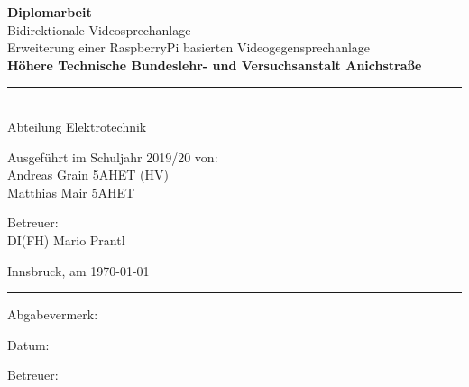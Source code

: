 \begin{center}
	\vspace*{2cm}
	\Huge\textbf{Diplomarbeit}\\
	\vspace*{2cm}
	\huge Bidirektionale Videosprechanlage\\
	\vspace*{0.5cm}
	\normalsize Erweiterung einer RaspberryPi basierten Videogegensprechanlage\\
	\vspace*{1.5cm}
	\textbf{Höhere Technische Bundeslehr- und Versuchsanstalt Anichstraße}\\
	\vspace*{0.5cm}
	\rule{0.75\linewidth}{0.4pt}\\
	\vspace*{0.5cm}
	Abteilung Elektrotechnik\\
	\vspace*{1cm}
	\begin{minipage}{0.425\linewidth}
		\begin{flushleft}
			Ausgeführt im Schuljahr 2019/20 von:\bigskip\\
			Andreas Grain 5AHET (HV)\\
			Matthias Mair 5AHET\\
		\end{flushleft}
	\end{minipage}
	\begin{minipage}{0.425\linewidth}
		\begin{flushright}
			Betreuer:\bigskip\\
			DI(FH) Mario Prantl\\
		\end{flushright}
	\end{minipage}
\end{center}
\vspace*{1cm}
\vfill
Innsbruck, am \today
\vspace*{1cm}
\hrule
\vspace*{1cm}
\noindent\begin{minipage}[b]{0.495\linewidth}
	Abgabevermerk:

	Datum:
\end{minipage}
\noindent\begin{minipage}[b]{0.495\linewidth}
	Betreuer:
\end{minipage}
\restoregeometry